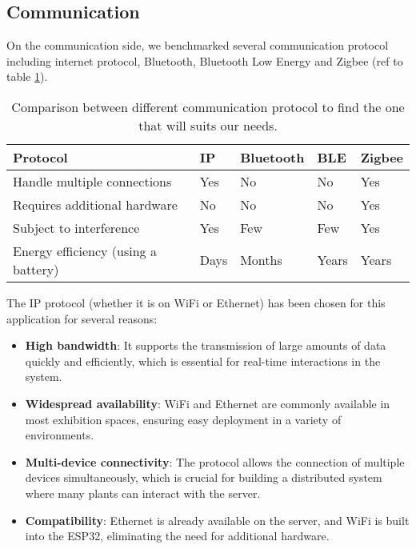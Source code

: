 \subsection{Communication}

On the communication side, we benchmarked several communication protocol including internet protocol,
Bluetooth, Bluetooth Low Energy and Zigbee (ref to table \ref{tab:protocol_comparison}).

\begin{table}[]
    \begin{tabular}{|l|l|l|l|l|}
        \hline
        Protocol                            & IP   & Bluetooth & BLE   & Zigbee \\ \hline
        Handle multiple connections         & Yes  & No        & No    & Yes    \\
        Requires additional hardware        & No   & No        & No    & Yes    \\
        Subject to interference             & Yes  & Few       & Few   & Yes    \\
        Energy efficiency (using a battery) & Days & Months    & Years & Years  \\ \hline
    \end{tabular}
    \caption{Comparison between different communication protocol to find the one that will suits our needs.}
    \label{tab:protocol_comparison}
\end{table}

The IP protocol (whether it is on WiFi or Ethernet) has been chosen for this application for several reasons:

\begin{itemize}
    \item \textbf{High bandwidth}: It supports the transmission of large amounts of data quickly and efficiently, which is essential for real-time interactions in the system.
    \item \textbf{Widespread availability}: WiFi and Ethernet are commonly available in most exhibition spaces, ensuring easy deployment in a variety of environments.
    \item \textbf{Multi-device connectivity}: The protocol allows the connection of multiple devices simultaneously, which is crucial for building a distributed system where many plants can interact with the server.
    \item \textbf{Compatibility}: Ethernet is already available on the server, and WiFi is built into the ESP32, eliminating the need for additional hardware.
\end{itemize}

